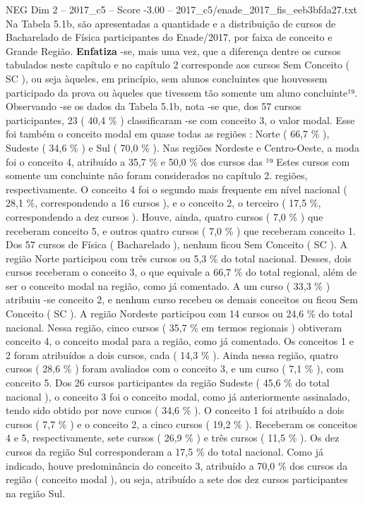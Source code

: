 \begin{textsample}{NEG Dim 2 – 2017\_c5 – Score -3.00 – 2017\_c5/enade\_2017\_fis\_eeb3bfda27.txt}
Na Tabela 5.1b, são apresentadas a quantidade e a distribuição de cursos de Bacharelado de Física participantes do Enade/2017, por faixa de conceito e Grande Região. \textbf{Enfatiza} -se, mais uma vez, que a diferença dentre os cursos tabulados neste capítulo e no capítulo 2 corresponde aos cursos Sem Conceito ( SC ), ou seja àqueles, em princípio, sem alunos concluintes que houvessem participado da prova ou àqueles que tivessem tão somente um aluno concluinte¹⁹.
Observando -se os dados da Tabela 5.1b, nota -se que, dos 57 cursos participantes, 23 ( 40,4 \% ) classificaram -se com conceito 3, o valor modal.
Esse foi também o conceito modal em quase todas as regiões : Norte ( 66,7 \% ), Sudeste ( 34,6 \% ) e Sul ( 70,0 \% ).
Nas regiões Nordeste e Centro-Oeste, a moda foi o conceito 4, atribuído a 35,7 \% e 50,0 \% dos cursos das ¹⁹ Estes cursos com somente um concluinte não foram considerados no capítulo 2. regiões, respectivamente.
O conceito 4 foi o segundo mais frequente em nível nacional ( 28,1 \%, correspondendo a 16 cursos ), e o conceito 2, o terceiro ( 17,5 \%, correspondendo a dez cursos ).
Houve, ainda, quatro cursos ( 7,0 \% ) que receberam conceito 5, e outros quatro cursos ( 7,0 \% ) que receberam conceito 1.
Dos 57 cursos de Física ( Bacharelado ), nenhum ficou Sem Conceito ( SC ).
A região Norte participou com três cursos ou 5,3 \% do total nacional.
Desses, dois cursos receberam o conceito 3, o que equivale a 66,7 \% do total regional, além de ser o conceito modal na região, como já comentado.
A um curso ( 33,3 \% ) atribuiu -se conceito 2, e nenhum curso recebeu os demais conceitos ou ficou Sem Conceito ( SC ).
A região Nordeste participou com 14 cursos ou 24,6 \% do total nacional.
Nessa região, cinco cursos ( 35,7 \% em termos regionais ) obtiveram conceito 4, o conceito modal para a região, como já comentado.
Os conceitos 1 e 2 foram atribuídos a dois cursos, cada ( 14,3 \% ).
Ainda nessa região, quatro cursos ( 28,6 \% ) foram avaliados com o conceito 3, e um curso ( 7,1 \% ), com conceito 5.
Dos 26 cursos participantes da região Sudeste ( 45,6 \% do total nacional ), o conceito 3 foi o conceito modal, como já anteriormente assinalado, tendo sido obtido por nove cursos ( 34,6 \% ).
O conceito 1 foi atribuído a dois cursos ( 7,7 \% ) e o conceito 2, a cinco cursos ( 19,2 \% ).
Receberam os conceitos 4 e 5, respectivamente, sete cursos ( 26,9 \% ) e três cursos ( 11,5 \% ).
Os dez cursos da região Sul corresponderam a 17,5 \% do total nacional.
Como já indicado, houve predominância do conceito 3, atribuído a 70,0 \% dos cursos da região ( conceito modal ), ou seja, atribuído a sete dos dez cursos participantes na região Sul.

\end{textsample}
